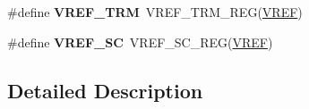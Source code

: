 \begin{DoxyCompactItemize}
\item 
\#define {\bfseries V\+R\+E\+F\+\_\+\+T\+RM}~V\+R\+E\+F\+\_\+\+T\+R\+M\+\_\+\+R\+EG(\hyperlink{group__VREF__Peripheral__Access__Layer_ga2c9e85d22a9ba37ea589b1747af46307}{V\+R\+EF})\hypertarget{group__VREF__Register__Accessor__Macros_ga3d9a836081732fa55a44bde53a2cb932}{}\label{group__VREF__Register__Accessor__Macros_ga3d9a836081732fa55a44bde53a2cb932}

\item 
\#define {\bfseries V\+R\+E\+F\+\_\+\+SC}~V\+R\+E\+F\+\_\+\+S\+C\+\_\+\+R\+EG(\hyperlink{group__VREF__Peripheral__Access__Layer_ga2c9e85d22a9ba37ea589b1747af46307}{V\+R\+EF})\hypertarget{group__VREF__Register__Accessor__Macros_ga58353078d385155f1c55fad5802549bb}{}\label{group__VREF__Register__Accessor__Macros_ga58353078d385155f1c55fad5802549bb}

\end{DoxyCompactItemize}


\subsection{Detailed Description}
